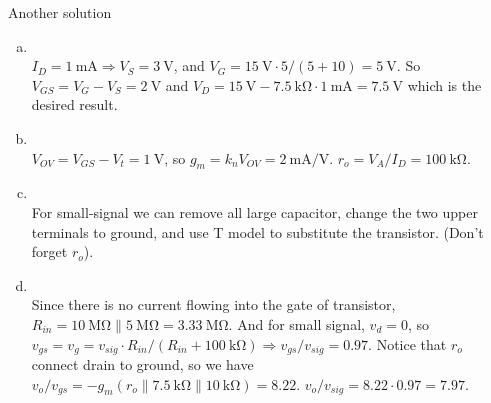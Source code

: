 \documentclass[12pt, a4paper]{article}
\begin{document}
\begin{enumerate}[(a)]
\end{enumerate}

Another solution \\
\begin{enumerate}[(a)]
  \item \Ans \\$I_D = \SI{1}{\mA} \Rightarrow V_S = \SI{3}{\V}$, and $V_G = \SI{15}{\V}
    \cdot 5/(5+10) = \SI{5}{\V}$. So $V_{GS} = V_G - V_S = \SI{2}{\V}$ and
    $V_D = \SI{15}{\V} - \SI{7.5}{\kohm} \cdot \SI{1}{\mA} = \SI{7.5}{\V}$
    which is the desired result.
  \item \Ans \\
    $V_{OV} = V_{GS} - V_t = \SI{1}{\V}$, so $g_m = k_n V_{OV} = \SI{2}{\mA/\V}$.
    $r_o = V_A / I_D = \SI{100}{\kohm}$.
  \item \Ans \\
    For small-signal we can remove all large capacitor, change the two upper
    terminals to ground, and use T model to substitute the transistor.
    (Don't forget $r_o$).
  \item \Ans \\
    Since there is no current flowing into the gate of transistor, 
    $R_{in} = \SI{10}{\mega\ohm} \parallel \SI{5}{\mega\ohm} = \SI{3.33}{\mega\ohm}$.
    And for small signal, $v_d = 0$, so $v_{gs} = v_g = v_{sig} \cdot
    R_{in} / (R_{in} + \SI{100}{\kohm}) \Rightarrow v_{gs}/v_{sig} = 0.97$.
    Notice that $r_o$ connect drain to ground, so we have $v_o/v_{gs} =
    -g_m (r_o \parallel \SI{7.5}{\kohm} \parallel \SI{10}{\kohm}) = 8.22$.
    $v_o / v_{sig} = 8.22 \cdot 0.97 = 7.97$.
\end{enumerate}
\end{document}
